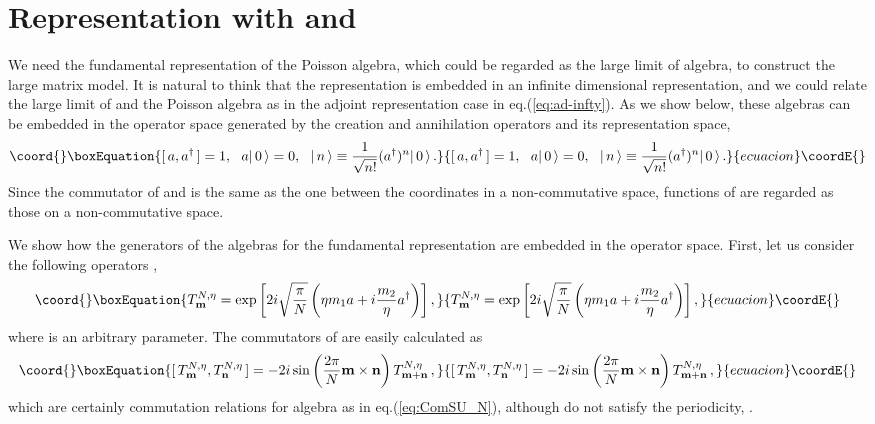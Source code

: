 \documentclass[a4paper,12pt]{article}
\providecommand{\ket}[1]{|\,#1\,\rangle}
\begin{document}
\section{Representation with  and 
\label{sec:aadag}}
We need the fundamental representation of the Poisson algebra, which
could be regarded as the large \coordHE{} limit of \coordHE{} algebra, to
construct the large \coordHE{} matrix model.
It is natural to think that the representation is embedded in an
infinite dimensional representation, and we could relate the large \coordHE{}
limit of \coordHE{} and the Poisson algebra as in the adjoint
representation case in eq.(\ref{eq:ad-infty}).
As we show below, these algebras can be embedded in the operator space
generated by the creation and annihilation operators and its
representation space,
\begin{equation}\coord{}\boxEquation{
 [\,a,a^\dagger\,]=1,~~a\ket{0}=0,~~
  \ket{n}\equiv\frac{1}{\sqrt{n!}}(a^\dagger)^n\ket{0}\,.
  \label{eq:FockSpace}
}{
 [\,a,a^\dagger\,]=1,~~a\ket{0}=0,~~
  \ket{n}\equiv\frac{1}{\sqrt{n!}}(a^\dagger)^n\ket{0}\,.
  }{ecuacion}\coordE{}\end{equation}
Since the commutator of \coordHE{} and \coordHE{} is the same as
the one between the coordinates in a non-commutative space, functions
of \coordHE{} are regarded as those on a non-commutative space.

We show how the generators of the algebras for the fundamental
representation are embedded in the operator space.
First, let us consider the following operators \cite{hoppesch},
\begin{equation}\coord{}\boxEquation{
 T^{N,\eta}_{\bf m}
  =  \exp\left[2i\sqrt{\frac{\pi}{N}} \left(\eta m_1 a + i
  \frac{m_2}{\eta} a^\dagger\right)\right],   \label{eq:TSU(N)}
}{
 T^{N,\eta}_{\bf m}
  =  \exp\left[2i\sqrt{\frac{\pi}{N}} \left(\eta m_1 a + i
  \frac{m_2}{\eta} a^\dagger\right)\right],   }{ecuacion}\coordE{}\end{equation}
where \myHighlight{$\eta$}\coordHE{} is an arbitrary parameter.
The commutators  of \coordHE{} are easily calculated as
\begin{equation}\coord{}\boxEquation{
 [\,T^{N,\eta}_{\bf m}, T^{N,\eta}_{\bf n}\,]
  =-2i\sin\left(\frac{2\pi}{N}{\bf m\times n}\right)
	 T^{N,\eta}_{\bf m+n}\,, \label{eq:TSU(N)Com}
}{
 [\,T^{N,\eta}_{\bf m}, T^{N,\eta}_{\bf n}\,]
  =-2i\sin\left(\frac{2\pi}{N}{\bf m\times n}\right)
	 T^{N,\eta}_{\bf m+n}\,, }{ecuacion}\coordE{}\end{equation}
which are certainly commutation relations for \coordHE{} algebra as in
eq.(\ref{eq:ComSU_N}), although \coordHE{} do not satisfy
the periodicity,
\coordHE{}.
\end{document}
